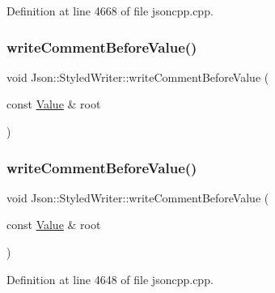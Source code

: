 Definition at line 4668 of file jsoncpp.\+cpp.

\hypertarget{class_json_1_1_styled_writer_ad3452c48fabf968bf3693549331ec06e}{}\label{class_json_1_1_styled_writer_ad3452c48fabf968bf3693549331ec06e} 
\subsubsection{\texorpdfstring{write\+Comment\+Before\+Value()}{writeCommentBeforeValue()}\hspace{0.1cm}{\footnotesize\ttfamily [1/2]}}
{\footnotesize\ttfamily void Json\+::\+Styled\+Writer\+::write\+Comment\+Before\+Value (\begin{DoxyParamCaption}\item[{const \hyperlink{class_json_1_1_value}{Value} \&}]{root }\end{DoxyParamCaption})\hspace{0.3cm}{\ttfamily [private]}}

\hypertarget{class_json_1_1_styled_writer_ad3452c48fabf968bf3693549331ec06e}{}\label{class_json_1_1_styled_writer_ad3452c48fabf968bf3693549331ec06e} 
\subsubsection{\texorpdfstring{write\+Comment\+Before\+Value()}{writeCommentBeforeValue()}\hspace{0.1cm}{\footnotesize\ttfamily [2/2]}}
{\footnotesize\ttfamily void Json\+::\+Styled\+Writer\+::write\+Comment\+Before\+Value (\begin{DoxyParamCaption}\item[{const \hyperlink{class_json_1_1_value}{Value} \&}]{root }\end{DoxyParamCaption})\hspace{0.3cm}{\ttfamily [private]}}



Definition at line 4648 of file jsoncpp.\+cpp.

\hypertarget{class_json_1_1_styled_writer_a885f4bfb5701896d60eee6716d2db7e4}{}\label{class_json_1_1_styled_writer_a885f4bfb5701896d60eee6716d2db7e4} 
